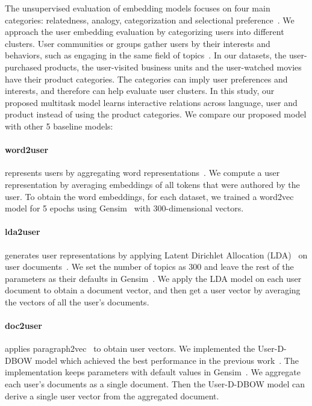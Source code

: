 The unsupervised evaluation of embedding models focuses on four main categories: relatedness, analogy, categorization and selectional preference~\cite{schnabel2015evaluation}.
We approach the user embedding evaluation by categorizing users into different clusters. 
User communities or groups gather users by their interests and behaviors, such as engaging in the same field of topics~\cite{benton2016learning, yang2017overcoming}.
In our datasets, the user-purchased products, the user-visited business units and the user-watched movies have their product categories. 
The categories can imply user preferences and interests, and therefore can help evaluate user clusters.
In this study, our proposed multitask model learns interactive relations across language, user and product instead of using the product categories. We compare our proposed model with other 5 baseline models:

\paragraph{word2user} 
represents users by aggregating word representations~\cite{benton2016learning}. We compute a user representation by averaging embeddings of all tokens that were authored by the user. To obtain the word embeddings, for each dataset, we trained a word2vec model for 5 epochs using Gensim~\cite{rehurek2010software} with 300-dimensional vectors.


\paragraph{lda2user} 
generates user representations by applying Latent Dirichlet Allocation (LDA)~\cite{blei2003latent} on user documents~\cite{pennacchiotti2011machine}. We set the number of topics as 300 and leave the rest of the parameters as their defaults in  Gensim~\cite{rehurek2010software}. We apply the LDA model on each user document to obtain a document vector, and then get a user vector by averaging the vectors of all the user's documents.


\paragraph{doc2user} 
applies paragraph2vec~\cite{le2014distributed} to obtain user vectors. We implemented the User-D-DBOW model which achieved the best performance in the previous work~\cite{ding2017multi}. The implementation keeps parameters with default values in Gensim~\cite{rehurek2010software}. We aggregate each user's documents as a single document. Then the User-D-DBOW model can derive a single user vector from the aggregated document.


